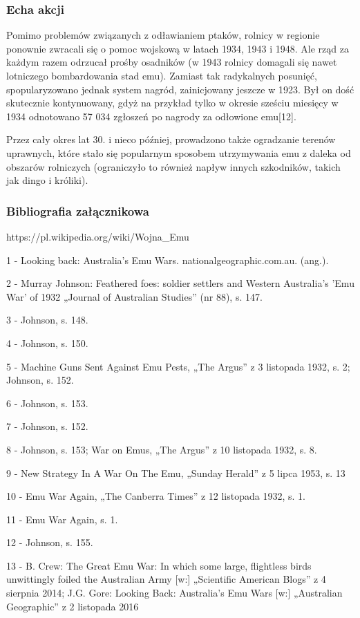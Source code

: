 \documentclass{beamer}
\begin{document}
\begin{frame}
\frametitle{Echa akcji}
Pomimo problemów związanych z odławianiem ptaków, rolnicy w regionie ponownie zwracali się o pomoc wojskową w latach 1934, 1943 i 1948. Ale rząd za każdym razem odrzucał prośby osadników (w 1943 rolnicy domagali się nawet lotniczego bombardowania stad emu). Zamiast tak radykalnych posunięć, spopularyzowano jednak system nagród, zainicjowany jeszcze w 1923. Był on dość skutecznie kontynuowany, gdyż na przykład tylko w okresie sześciu miesięcy w 1934 odnotowano 57 034 zgłoszeń po nagrody za odłowione emu[12].
\end{frame}
\begin{frame}
Przez cały okres lat 30. i nieco później, prowadzono także ogradzanie terenów uprawnych, które stało się popularnym sposobem utrzymywania emu z daleka od obszarów rolniczych (ograniczyło to również napływ innych szkodników, takich jak dingo i króliki).
\end{frame}
\begin{frame}[allowframebreaks]
\frametitle{Bibliografia załącznikowa} 
https://pl.wikipedia.org/wiki/Wojna\_Emu

1 - Looking back: Australia’s Emu Wars. nationalgeographic.com.au. (ang.).

2 - Murray Johnson: Feathered foes: soldier settlers and Western Australia's 'Emu War' of 1932 „Journal of Australian Studies” (nr 88), s. 147.

3 - Johnson, s. 148.

4 - Johnson, s. 150.

5 - Machine Guns Sent Against Emu Pests, „The Argus” z 3 listopada 1932, s. 2; Johnson, s. 152.

6 - Johnson, s. 153.

7 - Johnson, s. 152.

8 - Johnson, s. 153; War on Emus, „The Argus” z 10 listopada 1932, s. 8.

9 - New Strategy In A War On The Emu, „Sunday Herald” z 5 lipca 1953, s. 13

10 - Emu War Again, „The Canberra Times” z 12 listopada 1932, s. 1.

11 - Emu War Again, s. 1.

12 - Johnson, s. 155.

13 - B. Crew: The Great Emu War: In which some large, flightless birds unwittingly foiled the Australian Army [w:] „Scientific American Blogs” z 4 sierpnia 2014; J.G. Gore: Looking Back: Australia's Emu Wars [w:] „Australian Geographic” z 2 listopada 2016
\end{frame}
\end{document}

